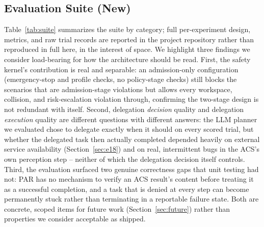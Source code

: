 \documentclass{article}
\begin{document}
\subsection{Evaluation Suite (New)}
\label{sec:ablation}
Table~\ref{tab:suite} summarizes the suite by category; full per-experiment design, metrics, and raw trial records are reported in the project repository rather than reproduced in full here, in the interest of space. We highlight three findings we consider load-bearing for how the architecture should be read. First, the safety kernel's contribution is real and separable: an admission-only configuration (emergency-stop and profile checks, no policy-stage checks) still blocks the scenarios that are admission-stage violations but allows every workspace, collision, and risk-escalation violation through, confirming the two-stage design is not redundant with itself. Second, delegation \emph{decision} quality and delegation \emph{execution} quality are different questions with different answers: the LLM planner we evaluated chose to delegate exactly when it should on every scored trial, but whether the delegated task then actually completed depended heavily on external service availability (Section~\ref{sec:e18}) and on real, intermittent bugs in the ACS's own perception step -- neither of which the delegation decision itself controls. Third, the evaluation surfaced two genuine correctness gaps that unit testing had not: PAR has no mechanism to verify an ACS result's content before treating it as a successful completion, and a task that is denied at every step can become permanently stuck rather than terminating in a reportable failure state. Both are concrete, scoped items for future work (Section~\ref{sec:future}) rather than properties we consider acceptable as shipped.
\end{document}
